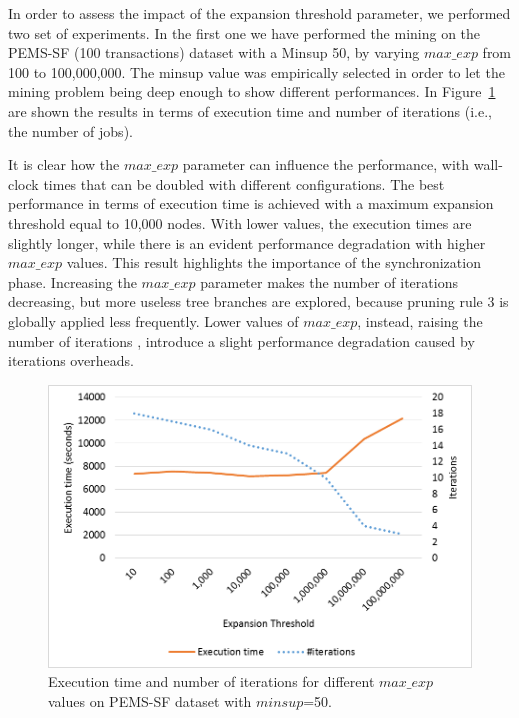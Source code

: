 In order to assess the impact of the expansion threshold parameter, we performed two set of experiments. In the first one we have performed the mining on the PEMS-SF (100 transactions) dataset with a Minsup 50, by varying $max\_exp$ from 100 to 100,000,000.  The minsup value was empirically selected in order to let the mining problem being deep enough to show different performances. 
In Figure~\ref{pems_fixed} are shown the results in terms of execution time and number of iterations 
(i.e., the number of jobs).

It is clear how the $max\_exp$ parameter can influence the performance, with wall-clock times that can be doubled with different configurations. The best performance in terms of execution time is achieved with a maximum
expansion threshold equal to 10,000 nodes. With lower values, the execution times are slightly longer, while there is an evident performance degradation with higher $max\_exp$ values. 
This result highlights the importance of the synchronization phase.
Increasing the $max\_exp$ parameter makes the number of iterations decreasing,
but more useless tree branches are explored,
because pruning rule 3 is globally applied less frequently.
Lower values of  $max\_exp$, instead, raising the number of iterations
, introduce a slight performance
degradation caused by iterations overheads.

\begin{figure}[!t]
\includegraphics[width=5in]{immagini_extension/pems_fixed.png}
\caption{Execution time and number of iterations for different $max\_exp$ values on PEMS-SF dataset with $minsup$=50.
}
\label{pems_fixed}
\end{figure}

